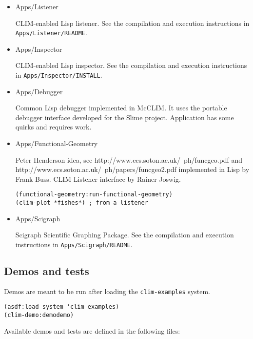 \begin{itemize}
\item Apps/Listener

  CLIM-enabled Lisp listener.  See the compilation and execution
  instructions in \texttt{Apps/Listener/README}.

\item Apps/Inspector

  CLIM-enabled Lisp inspector.  See the compilation and execution
  instructions in \texttt{Apps/Inspector/INSTALL}.

\item Apps/Debugger

  Common Lisp debugger implemented in McCLIM. It uses the portable
  debugger interface developed for the Slime project. Application has
  some quirks and requires work.

\item Apps/Functional-Geometry

  Peter Henderson idea, see http://www.ecs.soton.ac.uk/~ph/funcgeo.pdf
  and http://www.ecs.soton.ac.uk/~ph/papers/funcgeo2.pdf implemented
  in Lisp by Frank Buss. CLIM Listener interface by Rainer Joswig.

\begin{verbatim}
(functional-geometry:run-functional-geometry)
(clim-plot *fishes*) ; from a listener
\end{verbatim}

\item Apps/Scigraph

  Scigraph Scientific Graphing Package. See the compilation and
  execution instructions in \texttt{Apps/Scigraph/README}.
\end{itemize}

\subsection{Demos and tests}

Demos are meant to be run after loading the \texttt{clim-examples}
system.

\begin{verbatim}  
(asdf:load-system 'clim-examples)
(clim-demo:demodemo)
\end{verbatim}

Available demos and tests are defined in the following files:


